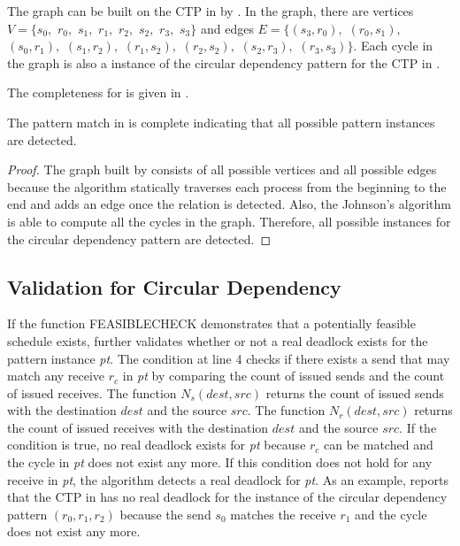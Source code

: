 The graph can be built on the CTP in  by . In the graph, there are vertices $V = \{s_0,$ $r_0,$ $s_1,$ $r_1,$ $r_2,$ $s_2,$ $r_3,$ $s_3\}$ and edges $E = \{(s_3,r_0),$ $(r_0,s_1),$ $(s_0,r_1),$ $(s_1,r_2),$ $(r_1,s_2),$ $(r_2,s_2),$ $(s_2,r_3),$ $(r_3,s_3)\}$. Each cycle in the graph is also a instance of the circular dependency pattern for the CTP in .

The completeness for  is given in . 
\begin{lemma}
\label{lemma:pmcircular}
The pattern match in  is complete indicating that all possible pattern instances are detected.
\end{lemma}
\begin{proof}
The graph built by  consists of all possible vertices and all possible edges because the algorithm statically traverses each process from the beginning to the end and adds an edge once the relation is detected. Also, the Johnson's algorithm is able to compute all the cycles in the graph. Therefore, all possible instances for the circular dependency pattern are detected. 
\end{proof}

\subsection{Validation for Circular Dependency}


If the function \textrm{FEASIBLECHECK} demonstrates that a potentially feasible schedule exists,  further validates whether or not a real deadlock exists for the pattern instance \textit{pt}. The condition at line 4 checks if there exists a send that may match any receive $\mathit{r_c}$ in \textit{pt} by comparing the count of issued sends and the count of issued receives.    
The function $\mathit{N_s}(\mathit{dest},\mathit{src})$ returns the count of issued sends with the destination $\mathit{dest}$ and the source $\mathit{src}$. The function $\mathit{N_r}(\mathit{dest},\mathit{src})$ returns the count of issued receives with the destination $\mathit{dest}$ and the source $\mathit{src}$.
If the condition is true, no real deadlock exists for \textit{pt} because $\mathit{r_c}$ can be matched and the cycle in \textit{pt} does not exist any more. If this condition does not hold for any receive in \textit{pt}, the algorithm detects a real deadlock for \textit{pt}.
As an example,  reports that the CTP in  has no real deadlock for the instance of the circular dependency pattern $(r_0,r_1,r_2)$ because the send $s_0$ matches the receive $r_1$ and the cycle does not exist any more.

